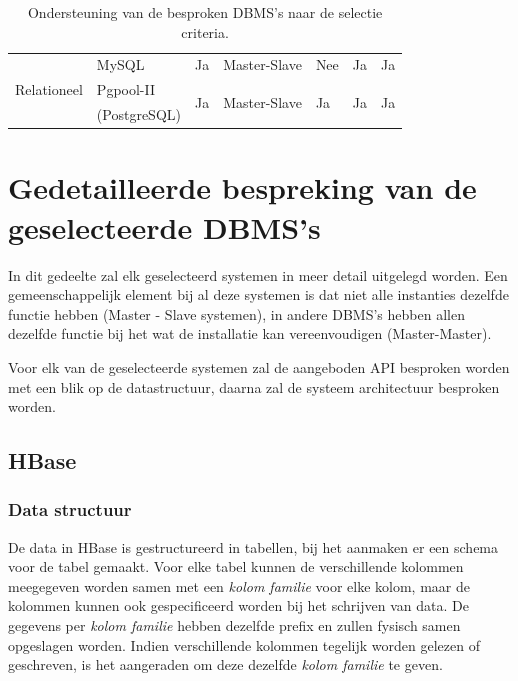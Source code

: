 \begin{table}[htbp]
{\begin{tabular}{ll|lllll}
          \hline
    \multirow{3}[0]{*}{Relationeel} & MySQL & Ja    & Master-Slave & Nee   & Ja    & Ja \\
          & Pgpool-II & \multicolumn{1}{l}{\multirow{2}[0]{*}{Ja}} & \multicolumn{1}{l}{\multirow{2}[0]{*}{Master-Slave}} & \multicolumn{1}{l}{\multirow{2}[0]{*}{Ja}} & \multicolumn{1}{l}{\multirow{2}[0]{*}{Ja}} & \multicolumn{1}{l}{\multirow{2}[0]{*}{Ja}} \\
          & (PostgreSQL) & \multicolumn{1}{l}{} & \multicolumn{1}{l}{} & \multicolumn{1}{l}{} & \multicolumn{1}{l}{} & \multicolumn{1}{l}{} \\
    \end{tabular}%
    }
    \caption{Ondersteuning van de besproken DBMS's naar de selectie criteria. }
  \label{table:vergelijkingNosql}%
\end{table}%





\section{Gedetailleerde bespreking van de geselecteerde DBMS's}
In dit gedeelte zal elk geselecteerd systemen in meer detail uitgelegd worden. Een gemeenschappelijk element bij al deze systemen is dat niet alle instanties dezelfde functie hebben (Master - Slave systemen), in andere DBMS's hebben allen dezelfde functie bij het wat de installatie kan vereenvoudigen (Master-Master). 

Voor elk van de geselecteerde systemen zal de aangeboden API besproken worden met een blik op de datastructuur, daarna zal de systeem architectuur besproken worden. 

\subsection{HBase}

\subsubsection{Data structuur\cite{george2011hbase}}
De data in HBase is gestructureerd in tabellen, bij het aanmaken er een schema voor de tabel gemaakt. Voor elke tabel kunnen de verschillende kolommen meegegeven worden samen met een \textit{kolom familie} voor elke kolom, maar de kolommen kunnen ook gespecificeerd worden bij het schrijven van data. De gegevens per \textit{kolom familie} hebben dezelfde prefix en zullen fysisch samen opgeslagen worden. Indien verschillende kolommen tegelijk worden gelezen of geschreven, is het aangeraden om deze dezelfde \textit{kolom familie} te geven. 

